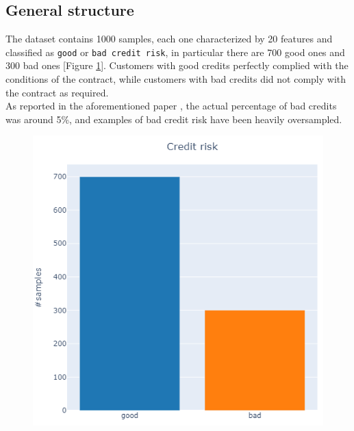 \documentclass[letterpaper]{article}
\begin{document}
	\subsection{General structure}
	The dataset contains 1000 samples, each one characterized by 20 features and classified as \texttt{good} or \texttt{bad credit risk}, in particular there are 700 good ones and 300 bad ones [Figure \ref{fig:1}].  Customers with good credits perfectly complied with the conditions of the contract, while customers with bad credits did not comply with the contract as required.\\ As reported in the aforementioned paper \cite{gromping}, the actual percentage of bad credits was around 5\%, and examples of bad credit risk have been heavily oversampled. 
	
	\begin{figure}[h]
		\centering
		\includegraphics[width=.35\textwidth]{images/class.png}
		\label{fig:1}
		
	\end{figure}
	
\end{document}
